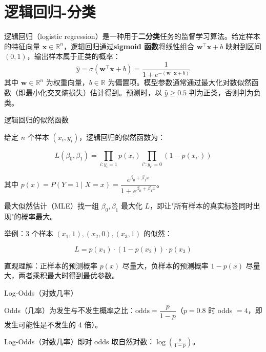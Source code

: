 \chapter{逻辑回归-分类}
\begin{definition}
逻辑回归（logistic regression）是一种用于\textbf{二分类}任务的监督学习算法。给定样本的特征向量 $\boldsymbol{x} \in \mathbb{R}^n$，逻辑回归通过\textbf{sigmoid 函数}将线性组合 $\boldsymbol{w}^\top \boldsymbol{x} + b$ 映射到区间 $(0,1)$，输出样本属于正类的概率：
\[
\hat{y} = \sigma(\boldsymbol{w}^\top \boldsymbol{x} + b) = \frac{1}{1 + e^{-(\boldsymbol{w}^\top \boldsymbol{x} + b)}}
\]
其中 $\boldsymbol{w} \in \mathbb{R}^n$ 为权重向量，$b \in \mathbb{R}$ 为偏置项。模型参数通常通过最大化对数似然函数（即最小化交叉熵损失）估计得到。预测时，以 $\hat{y} \geq 0.5$ 判为正类，否则判为负类。
\end{definition}



\begin{note}{逻辑回归的似然函数}

给定 $n$ 个样本 $(x_i, y_i)$，逻辑回归的似然函数为：

\[
L(\beta_0, \beta_1) = \prod_{i: y_i=1} p(x_i) \prod_{i': y_{i'}=0} (1-p(x_{i'}))
\]

其中 $p(x) = P(Y=1 \mid X=x) = \dfrac{e^{\beta_0+\beta_1 x}}{1+e^{\beta_0+\beta_1 x}}$。

最大似然估计（MLE）找一组 $\beta_0, \beta_1$ 最大化 $L$，即让"所有样本的真实标签同时出现"的概率最大。

举例：3 个样本 $(x_1,1), (x_2,0), (x_3,1)$ 的似然：

\[
L = p(x_1) \cdot (1-p(x_2)) \cdot p(x_3)
\]

直观理解：正样本的预测概率 $p(x)$ 尽量大，负样本的预测概率 $1-p(x)$ 尽量大，两者乘积最大时得到最优参数。

\end{note}
\begin{definition}{Log-Odds（对数几率）}

Odds（几率）为发生与不发生概率之比：$\text{odds} = \dfrac{p}{1-p}$（$p=0.8$ 时 odds $=4$，即发生可能性是不发生的 4 倍）。

Log-Odds（对数几率）即对 odds 取自然对数：$\displaystyle\log\left(\frac{p}{1-p}\right)$。

\end{definition}

